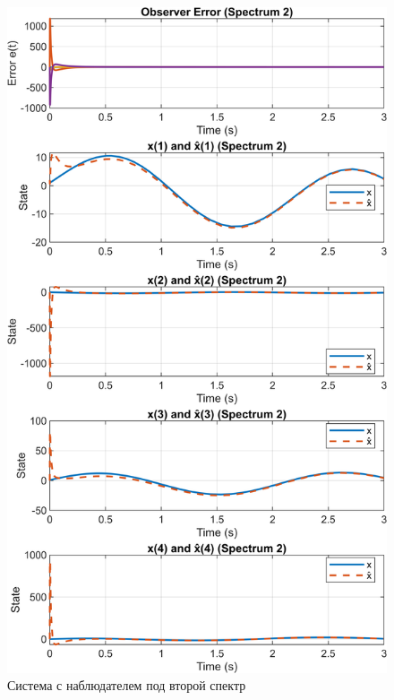 \begin{figure}[H]
    \centering
    \includegraphics[width=0.8\linewidth]{figs/task2_2.png}
    \caption{Система с наблюдателем под второй спектр}
    \label{fig:2_2}
\end{figure}


